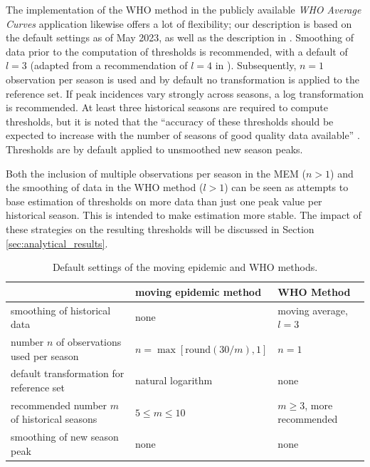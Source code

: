\documentclass{article}
\begin{document}
The implementation of the WHO method in the publicly available \textit{WHO Average Curves} application \citep{WHO2023} likewise offers a lot of flexibility; our description is based on the default settings as of May 2023, as well as the description in \cite{WHO2014}. Smoothing of data prior to the computation of thresholds is recommended, with a default of $l = 3$ (adapted from a recommendation of $l = 4$ in \citealt[p68]{WHO2014}). Subsequently, $n = 1$ observation per season is used and by default no transformation is applied to the reference set. If peak incidences vary strongly across seasons, a log transformation is recommended. At least three historical seasons are required to compute thresholds, but it is noted that the ``accuracy of these thresholds should be expected to increase with the number of seasons of good quality data available'' \cite[p22]{WHO2023}. %
Thresholds are by default applied to unsmoothed new season peaks.

Both the inclusion of multiple observations per season in the MEM ($n > 1$) and the smoothing of data in the WHO method ($l > 1$) can be seen as attempts to base estimation of thresholds on more data than just one peak value per historical season. This is intended to make estimation more stable. The impact of these strategies on the resulting thresholds will be discussed in Section \ref{sec:analytical_results}.




\begin{table}[h]
\caption{Default settings of the moving epidemic and WHO methods.}
\label{tab:differences}
\begin{center}
\footnotesize
\begin{tabular}{lll}
\toprule
& moving epidemic method & WHO Method \\
\midrule
smoothing of historical data & none & moving average, $l = 3$\\
number $n$ of observations used per season & $n = \max[\text{round}(30/m), 1]$ & $n = 1$\\
default transformation for reference set & natural logarithm & none\\
recommended number $m$ of historical seasons & $5 \leq m \leq 10$ & $m \geq 3$, more recommended\\
smoothing of new season peak & none & none\\
\bottomrule
\end{tabular}
\end{center}

\end{table}
\end{document}
